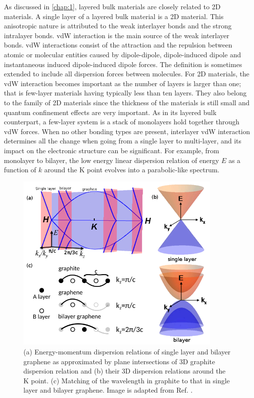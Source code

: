 As discussed in \autoref{chap:1}, layered bulk materials are closely related to 2D materials. A single layer of a layered bulk material is a 2D material. This anisotropic nature is attributed to the weak interlayer bonds and the strong intralayer bonds. vdW interaction \cite{vdws} is the main source of the weak interlayer bonds. vdW interactions consist of the attraction and the repulsion between atomic or molecular entities caused by dipole-dipole, dipole-induced dipole and instantaneous induced dipole-induced dipole forces. The definition is sometimes extended to include all dispersion forces between molecules.  For 2D materials, the vdW interaction becomes important as the number of layers is larger than one; that is few-layer materials having typically less than ten layers. They also belong to the family of 2D materials since the thickness of the materials is still small and quantum confinement effects are very important. As in its layered bulk counterpart, a few-layer system is a stack of monolayers hold together through vdW forces. When no other bonding types are present, interlayer vdW interaction determines all the change when going from a single layer to multi-layer, and its impact on the electronic structure can be significant. For example, from monolayer to bilayer, the low energy linear dispersion relation of energy $E$ as a function of $k$ around the $\mathrm{K}$ point evolves into a parabolic-like spectrum\cite{Partoens2006,Mak2010a}. 

\begin{figure}[ht] 
\centering  
\includegraphics[width=0.9\textwidth]{gra_band.png}
\caption[Energy-momentum dispersion of graphene from graphite]{(a) Energy-momentum dispersion relations of single layer and bilayer graphene as approximated by plane intersections of 3D graphite dispersion relation and (b) their 3D dispersion relations around the $\mathrm{K}$ point. (c) Matching of the wavelength in graphite to that in single layer and bilayer graphene. Image is adapted from Ref. \cite{Mak2010a}. }  
\label{fig:gra_bands}
\end{figure} 

